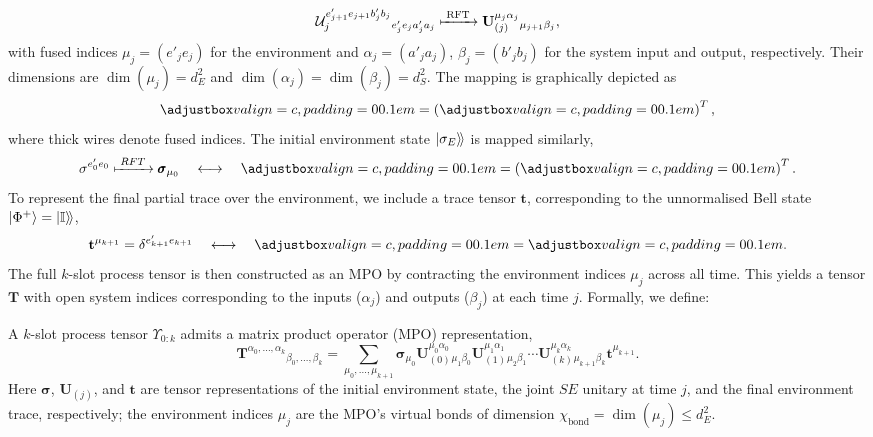 \begin{equation*}
    \mathcal{U}_j^{e'_{j+1} e_{j+1} b'_j b_j}{}_{e'_j e_j a'_j a_j} \xmapsto{\;\mathrm{RFT}\;} \mathbf{U}_{(j)}^{\mu_j \alpha_j}{}_{\mu_{j+1} \beta_j},
\end{equation*}
with fused indices \(\mu_j = (e'_j e_j)\) for the environment and \(\alpha_j=(a'_j a_j)\), \(\beta_j=(b'_j b_j)\) for the system input and output, respectively. Their dimensions are \(\dim(\mu_j) = d_E^2\) and \(\dim(\alpha_j) = \dim(\beta_j) = d_S^2\). The mapping is graphically depicted as
\begin{equation*}
    \valignbox{} 
    = 
    \left(\valignbox{}\right)^T,
\end{equation*}
where thick wires denote fused indices. The initial environment state \(| \sigma_E \rangle \! \rangle\) is mapped similarly,
\begin{equation*}
    \sigma^{e'_0e_0} \xmapsto {\;RFT\;} \pmb{\sigma}_{\mu_0} 
    \quad\longleftrightarrow\quad
    \valignbox{} = \left(\valignbox{}\right)^T.
\end{equation*}
To represent the final partial trace over the environment, we include a trace tensor \(\mathbf{t}\), corresponding to the unnormalised Bell state \(\ket{\Phi^+} = | \mathbb{I} \rangle \! \rangle\),
\begin{equation*}
    \mathbf{t}^{\mu_{k+1}} = \delta^{e'_{k+1}e_{k+1}}
    \quad\longleftrightarrow\quad
    \valignbox{} = \valignbox{}.
\end{equation*}
The full \(k\)-slot process tensor is then constructed as an MPO by contracting the environment indices \(\mu_j\) across all time. This yields a tensor \(\mathbf{T}\) with open system indices corresponding to the inputs (\(\alpha_j\)) and outputs (\(\beta_j\)) at each time \(j\). Formally, we define:
\begin{definition}\label{def:pt-mpo}
A $k$-slot process tensor $\Upsilon_{0:k}$ admits a matrix product operator (MPO) representation,
\begin{equation}
    \mathbf{T}^{\alpha_0,\dots,\alpha_k}{}_{\beta_0,\dots,\beta_k} = \sum_{\mu_0,\dots,\mu_{k+1}} \pmb{\sigma}_{\mu_0}\mathbf{U}_{(0)}^{\mu_0\alpha_0}{}_{\mu_1\beta_0}\mathbf{U}_{(1)}^{\mu_1\alpha_1}{}_{\mu_2\beta_1}\cdots\mathbf{U}_{(k)}^{\mu_k\alpha_k}{}_{\mu_{k+1}\beta_k}\mathbf{t}^{\mu_{k+1}}.
\end{equation}
Here $\pmb{\sigma}$, $\mathbf{U}_{(j)}$, and $\mathbf{t}$ are tensor representations of the initial environment state, the joint $SE$ unitary at time $j$, and the final environment trace, respectively; the environment indices $\mu_j$ are the MPO's virtual bonds of dimension \(\chi_\mathrm{bond} = \dim{(\mu_j)} \le d_E^2\).
\end{definition}
